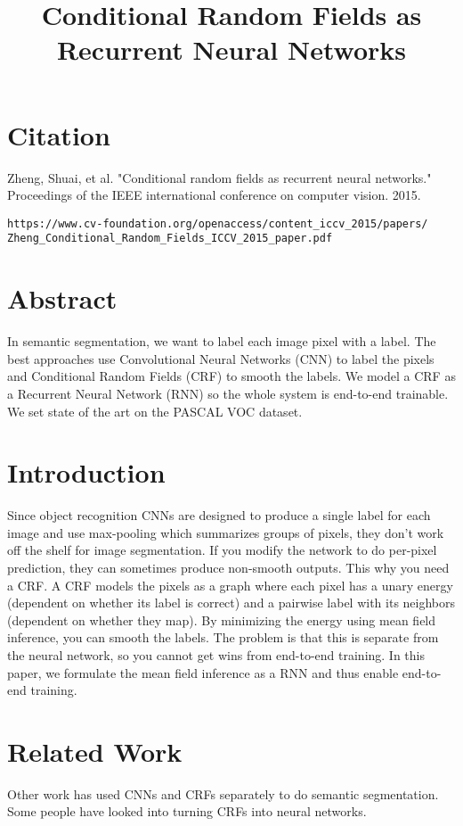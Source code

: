 \documentclass[a4paper]{article}
\title{Conditional Random Fields as Recurrent Neural Networks}
\date{}
\begin{document}
\maketitle

\section{Citation}
Zheng, Shuai, et al. "Conditional random fields as recurrent neural networks." Proceedings of the IEEE international conference on computer vision. 2015.

\begin{verbatim}
https://www.cv-foundation.org/openaccess/content_iccv_2015/papers/
Zheng_Conditional_Random_Fields_ICCV_2015_paper.pdf
\end{verbatim}

\section{Abstract}
In semantic segmentation, we want to label each image pixel with a label.
The best approaches use Convolutional Neural Networks (CNN) to label the
pixels and Conditional Random Fields (CRF) to smooth the labels. We model a
CRF as a Recurrent Neural Network (RNN) so the whole system is end-to-end
trainable. We set state of the art on the PASCAL VOC dataset.

\section{Introduction}
Since object recognition CNNs are designed to produce a single label for each
image and use max-pooling which summarizes groups of pixels, they don't work off
the shelf for image segmentation. If you modify the network to do per-pixel
prediction, they can sometimes produce non-smooth outputs. This why you
need a CRF. A CRF models the pixels as a graph where each pixel has a unary
energy (dependent on whether its label is correct) and a pairwise label with
its neighbors (dependent on whether they map). By minimizing the energy using
mean field inference, you can smooth the labels. The problem is that this
is separate from the neural network, so you cannot get wins from end-to-end
training. In this paper, we formulate the mean field inference as a RNN and
thus enable end-to-end training.

\section{Related Work}
Other work has used CNNs and CRFs separately to do semantic segmentation.
Some people have looked into turning CRFs into neural networks.
\end{document}
